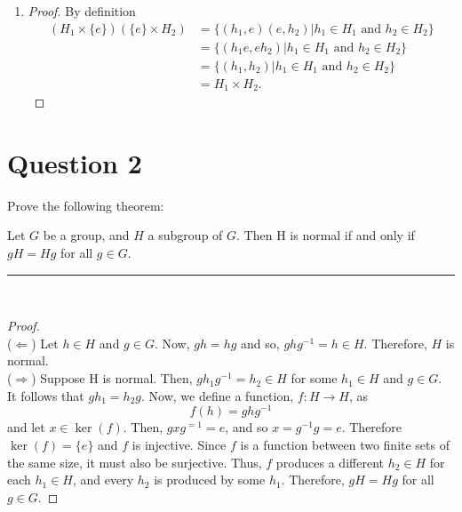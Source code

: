 \documentclass[12pt]{article}
\def\bar{\rule{\linewidth}{0.4pt}}
\begin{document}
\begin{enumerate}[label=\alph*)]
\begin{proof}
        \end{proof}
        \item \begin{proof}
            By definition
            \begin{equation*}
                \begin{split}
                    (H_1\times\{ e \})(\{ e \}\times H_2) &=\{(h_1, e)(e, h_2)|h_1 \in H_1 \text{ and } h_2 \in H_2\}\\
                    &= \{(h_1e, eh_2)|h_1 \in H_1 \text{ and } h_2 \in H_2\}\\
                    & = \{(h_1, h_2)|h_1 \in H_1 \text{ and } h_2 \in H_2\}\\
                    &= H_1 \times H_2.
                \end{split}
            \end{equation*}
        \end{proof}
    \end{enumerate}
    
\section*{Question 2}
Prove the following theorem:
\begin{theorem}
    Let \(G\) be a group, and \(H\) a subgroup of \(G\). Then H is normal if and only if \(gH = Hg\) for all \(g \in G\).
\end{theorem}
\bar\\
\begin{proof}
    \\(\(\Leftarrow\)) Let \(h\in H\) and \(g\in G\). Now, \(gh = hg\) and so, \(ghg^{-1} = h \in H\). Therefore, \(H\) is normal.\\
    (\(\Rightarrow\)) Suppose H is normal. Then, \(gh_1g^{-1}=h_2\in H\) for some \(h_1\in H\) and \(g\in G\). It follows that \(gh_1 = h_2g\). Now, we define a function, \(f:H\rightarrow H\), as
    \begin{equation}
        f(h) = ghg^{-1}
    \end{equation}   
    and let \(x \in \ker(f)\). Then, \(gxg^{=1} = e\), and so \(x = g^{-1}g = e\). Therefore \(\ker(f) = \{e\} \) and \(f\) is injective. Since \(f\) is a function between two finite sets of the same size, it must also be surjective. Thus, \(f\) produces a different \(h_2 \in H\) for each \(h_1\in H\), and every \(h_2\) is produced by some \(h_1\). Therefore, \(gH = Hg\) for all \(g\in G\).
\end{proof}
\end{document}
